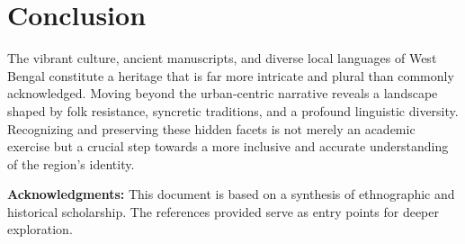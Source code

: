 \documentclass{article}
\begin{document}
\section{Conclusion}
The vibrant culture, ancient manuscripts, and diverse local languages of West Bengal constitute a heritage that is far more intricate and plural than commonly acknowledged. Moving beyond the urban-centric narrative reveals a landscape shaped by folk resistance, syncretic traditions, and a profound linguistic diversity. Recognizing and preserving these hidden facets is not merely an academic exercise but a crucial step towards a more inclusive and accurate understanding of the region's identity.

\medskip
\noindent\textbf{Acknowledgments:} This document is based on a synthesis of ethnographic and historical scholarship. The references provided serve as entry points for deeper exploration.
\end{document}
